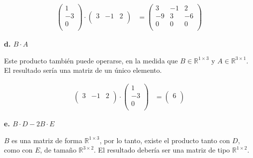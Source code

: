 \documentclass[11pt]{article}
\begin{document}
\begin{align*}
  \begin{pmatrix}
    1  \\
    -3 \\
    0  \\
  \end{pmatrix}
  \cdot
  \begin{pmatrix}
    3 & -1 & 2 \\
  \end{pmatrix}
   & =
  \boxed{
    \begin{pmatrix}
      3  & -1 & 2  \\
      -9 & 3  & -6 \\
      0  & 0  & 0  \\
    \end{pmatrix}
  }
\end{align*}

\textbf{d. \(B \cdot A\)}

Este producto también puede operarse,
en la medida que \(B \in \mathbb{R}^{1 \times 3}\)
y \(A \in \mathbb{R}^{3 \times 1}\).
El resultado sería una matriz de un único elemento.

\begin{align*}
  \begin{pmatrix}
    3 & -1 & 2 \\
  \end{pmatrix}
  \cdot
  \begin{pmatrix}
    1  \\
    -3 \\
    0  \\
  \end{pmatrix}
   & =
  \boxed{
    \begin{pmatrix}
      6 \\
    \end{pmatrix}
  }
\end{align*}

\textbf{e. \(B \cdot D - 2B \cdot E\)}

\(B\) es una matriz de forma \(\mathbb{R}^{1 \times 3}\),
por lo tanto, existe el producto tanto con \(D\), como con \(E\),
de tamaño \(\mathbb{R}^{3 \times 2}\).
El resultado debería ser una matriz de tipo \(\mathbb{R}^{1 \times 2}\).
\end{document}
